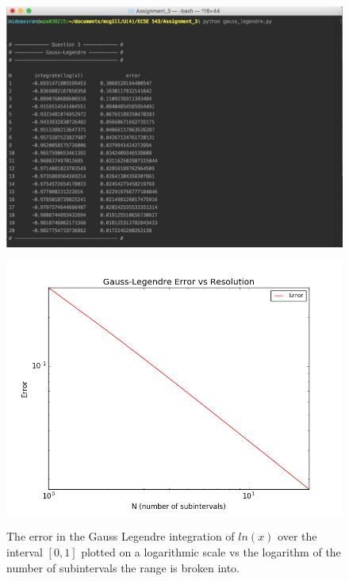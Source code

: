 \documentclass[11pt]{article}
\begin{document}
\begin{figure}[!hbp]
	\begin{center}
		\begin{minipage}{ 0.7\textwidth}
			\includegraphics[width= \textwidth]{o_GL_log}\\
		\end{minipage}
		\begin{minipage}{ \textwidth}
			\includegraphics[width=\textwidth]{GL_log}\\
		\end{minipage}
		\caption{\label{fig:GL_log}The error in the Gauss Legendre integration of $ln(x)$ over the interval $[0,1]$ plotted on a logarithmic scale vs the logarithm of the number of subintervals the range is broken into.}
	\end{center}
\end{figure}
\end{document}
